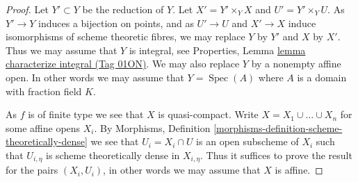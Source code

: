 \documentclass{amsart}
\theoremstyle{plain}
\theoremstyle{definition}
\theoremstyle{remark}
\numberwithin{equation}{subsection}
\def\Spec{\mathop{\mathrm{Spec}}}
\begin{document}
\begin{proof}
Let $Y' \subset Y$ be the reduction of $Y$.
Let $X' = Y' \times_Y X$ and $U' = Y' \times_Y U$.
As $Y' \to Y$ induces a bijection on points, and as
$U' \to U$ and $X' \to X$ induce isomorphisms of scheme theoretic fibres,
we may replace $Y$ by $Y'$ and $X$ by $X'$.
Thus we may assume that $Y$ is integral, see
Properties, Lemma \href{https://stacks.math.columbia.edu/tag/01ON}{lemma characterize integral (Tag 01ON)}.
We may also replace $Y$ by a nonempty affine open. In other words we
may assume that $Y = \Spec(A)$ where $A$ is a domain with fraction
field $K$.

\medskip\noindent
As $f$ is of finite type we see that $X$ is quasi-compact.
Write $X = X_1 \cup \ldots \cup X_n$ for some affine opens $X_i$. By
Morphisms, Definition \ref{morphisms-definition-scheme-theoretically-dense}
we see that $U_i = X_i \cap U$ is an open subscheme of $X_i$ such that
$U_{i, \eta}$ is scheme theoretically dense in $X_{i, \eta}$.
Thus it suffices to prove the result for the pairs $(X_i, U_i)$,
in other words we may assume that $X$ is affine.


\end{proof}
\end{document}
